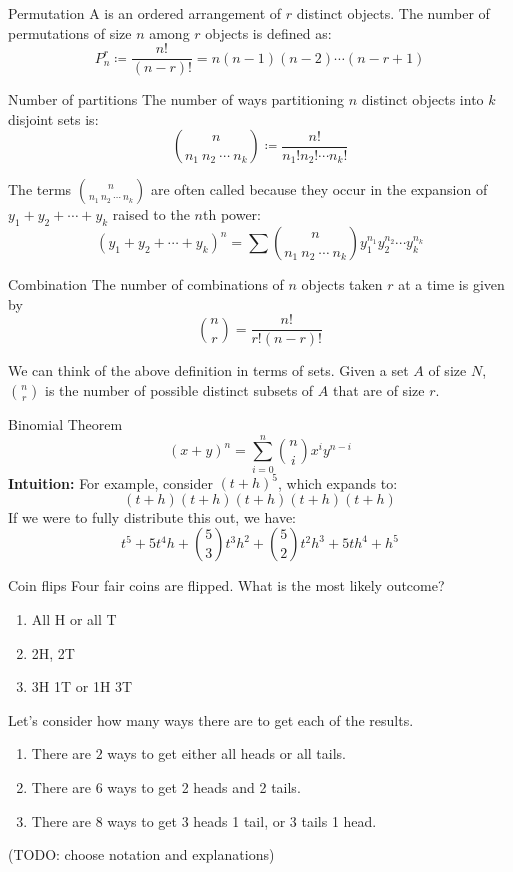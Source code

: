 \begin{dfnbox}{Permutation}{}
    A  is an ordered arrangement of $r$ distinct objects. The number of permutations of size $n$ among $r$ objects is defined as:
    \[ P_n^r \coloneq \frac{n!}{(n-r)!} = n(n-1)(n-2)\cdots(n-r+1) \]
\end{dfnbox}

\begin{thmbox}{Number of partitions}{}
    The number of ways partitioning $n$ distinct objects into $k$ disjoint sets is:
    \[ \binom{n}{n_1\ n_2\ \cdots\ n_k} \coloneq \frac{n!}{n_1! n_2! \cdots n_k!} \]
\end{thmbox}

The terms $\binom{n}{n_1\ n_2\ \cdots\ n_k}$ are often called  because they occur in the expansion of $y_1 + y_2 + \cdots + y_k$ raised to the $n$th power:
\[ (y_1 + y_2 + \cdots + y_k)^n = \sum \binom{n}{n_1\ n_2\ \cdots\ n_k} y_1^{n_1} y_2^{n_2} \cdots y_k^{n_k} \]

\begin{dfnbox}{Combination}{}
    The number of combinations of $n$ objects taken $r$ at a time is given by
    \[ \binom{n}{r} = \frac{n!}{r!(n-r)!} \]
\end{dfnbox}

We can think of the above definition in terms of sets. Given a set $A$ of size $N$, $\binom{n}{r}$ is the number of possible distinct subsets of $A$ that are of size $r$.

\begin{thmbox}{Binomial Theorem}{}
    \[ (x+y)^n = \sum_{i=0}^{n} \binom{n}{i} x^i y^{n-i} \]
    \tcblower
    \textbf{Intuition:} For example, consider $(t+h)^5$, which expands to:
    \[ (t+h)(t+h)(t+h)(t+h)(t+h) \]
    If we were to fully distribute this out, we have:
    \[ t^5 + 5t^4h + \binom{5}{3} t^3 h^2 + \binom{5}{2} t^2 h^3 + 5th^4 + h^5 \]
\end{thmbox}


\begin{exbox}{Coin flips}{}
    Four fair coins are flipped. What is the most likely outcome?
    \begin{enumerate}[label=(\alph*)]
        \item All H or all T
        \item 2H, 2T
        \item 3H 1T or 1H 3T
    \end{enumerate}
    \tcblower
    Let's consider how many ways there are to get each of the results.
    \begin{enumerate}[label=(\alph*)]
        \item There are $2$ ways to get either all heads or all tails.
        \item There are $6$ ways to get 2 heads and 2 tails.
        \item There are $8$ ways to get 3 heads 1 tail, or 3 tails 1 head.
    \end{enumerate}
    (TODO: choose notation and explanations)
\end{exbox}

